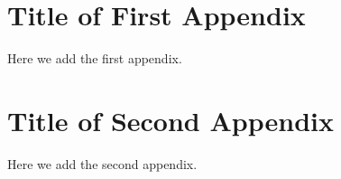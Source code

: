 \documentclass[12pt,a4paper,titlepage,openany]{report}
\begin{document}
\appendix
\thispagestyle{empty}

\chapter{Title of First Appendix}
\thispagestyle{empty}
Here we add the first appendix.


\chapter{Title of Second Appendix}
\thispagestyle{empty}
Here we add the second appendix.


\end{document}
